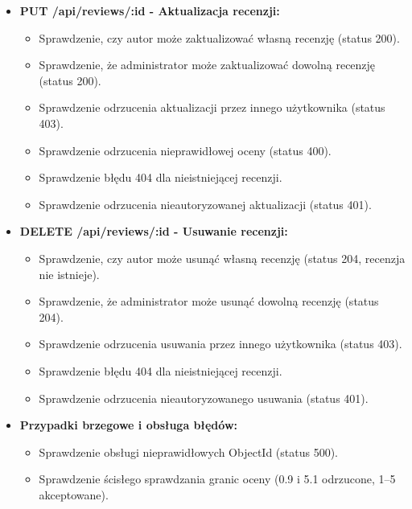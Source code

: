 \documentclass{article}
\begin{document}
\begin{itemize}
    \item \textbf{PUT /api/reviews/:id - Aktualizacja recenzji:}
    \begin{itemize}
        \item Sprawdzenie, czy autor może zaktualizować własną recenzję (status 200).
        \item Sprawdzenie, że administrator może zaktualizować dowolną recenzję (status 200).
        \item Sprawdzenie odrzucenia aktualizacji przez innego użytkownika (status 403).
        \item Sprawdzenie odrzucenia nieprawidłowej oceny (status 400).
        \item Sprawdzenie błędu 404 dla nieistniejącej recenzji.
        \item Sprawdzenie odrzucenia nieautoryzowanej aktualizacji (status 401).
    \end{itemize}

    \item \textbf{DELETE /api/reviews/:id - Usuwanie recenzji:}
    \begin{itemize}
        \item Sprawdzenie, czy autor może usunąć własną recenzję (status 204, recenzja nie istnieje).
        \item Sprawdzenie, że administrator może usunąć dowolną recenzję (status 204).
        \item Sprawdzenie odrzucenia usuwania przez innego użytkownika (status 403).
        \item Sprawdzenie błędu 404 dla nieistniejącej recenzji.
        \item Sprawdzenie odrzucenia nieautoryzowanego usuwania (status 401).
    \end{itemize}

    \item \textbf{Przypadki brzegowe i obsługa błędów:}
    \begin{itemize}
        \item Sprawdzenie obsługi nieprawidłowych ObjectId (status 500).
        \item Sprawdzenie ścisłego sprawdzania granic oceny (0.9 i 5.1 odrzucone, 1–5 akceptowane).
    \end{itemize}
\end{itemize}
\end{document}
